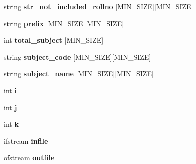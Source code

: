 \begin{DoxyCompactItemize}
\item 
\hypertarget{classReadInput_af8bf5dd02c9ad4baa9b3dad46de05584}{string {\bfseries str\-\_\-not\-\_\-included\-\_\-rollno} \mbox{[}M\-I\-N\-\_\-\-S\-I\-Z\-E\mbox{]}\mbox{[}M\-I\-N\-\_\-\-S\-I\-Z\-E\mbox{]}}\label{classReadInput_af8bf5dd02c9ad4baa9b3dad46de05584}

\item 
\hypertarget{classReadInput_a22e77d892c3c600f6d1344c54d0953dd}{string {\bfseries prefix} \mbox{[}M\-I\-N\-\_\-\-S\-I\-Z\-E\mbox{]}\mbox{[}M\-I\-N\-\_\-\-S\-I\-Z\-E\mbox{]}}\label{classReadInput_a22e77d892c3c600f6d1344c54d0953dd}

\item 
\hypertarget{classReadInput_a6104862202913ac59bae308e9f61fbd5}{int {\bfseries total\-\_\-subject} \mbox{[}M\-I\-N\-\_\-\-S\-I\-Z\-E\mbox{]}}\label{classReadInput_a6104862202913ac59bae308e9f61fbd5}

\item 
\hypertarget{classReadInput_ad54949b5b77968f69e6459e24aa29cd8}{string {\bfseries subject\-\_\-code} \mbox{[}M\-I\-N\-\_\-\-S\-I\-Z\-E\mbox{]}\mbox{[}M\-I\-N\-\_\-\-S\-I\-Z\-E\mbox{]}}\label{classReadInput_ad54949b5b77968f69e6459e24aa29cd8}

\item 
\hypertarget{classReadInput_aed16990a1fd7dfc21c69fbf07892c256}{string {\bfseries subject\-\_\-name} \mbox{[}M\-I\-N\-\_\-\-S\-I\-Z\-E\mbox{]}\mbox{[}M\-I\-N\-\_\-\-S\-I\-Z\-E\mbox{]}}\label{classReadInput_aed16990a1fd7dfc21c69fbf07892c256}

\item 
\hypertarget{classReadInput_aa5794ec3922f26d376dba09946e73178}{int {\bfseries i}}\label{classReadInput_aa5794ec3922f26d376dba09946e73178}

\item 
\hypertarget{classReadInput_a9cff282fd247d9eca49c1acde4d08b11}{int {\bfseries j}}\label{classReadInput_a9cff282fd247d9eca49c1acde4d08b11}

\item 
\hypertarget{classReadInput_a28d5df9f425e54bb3575bdcc4d41a4d1}{int {\bfseries k}}\label{classReadInput_a28d5df9f425e54bb3575bdcc4d41a4d1}

\item 
\hypertarget{classReadInput_a0d12e64fa5ff8c210f5ac494021318ae}{ifstream {\bfseries infile}}\label{classReadInput_a0d12e64fa5ff8c210f5ac494021318ae}

\item 
\hypertarget{classReadInput_aa25ad1c8e7ef638eddc2ffb96e1c49c2}{ofstream {\bfseries outfile}}\label{classReadInput_aa25ad1c8e7ef638eddc2ffb96e1c49c2}

\end{DoxyCompactItemize}


